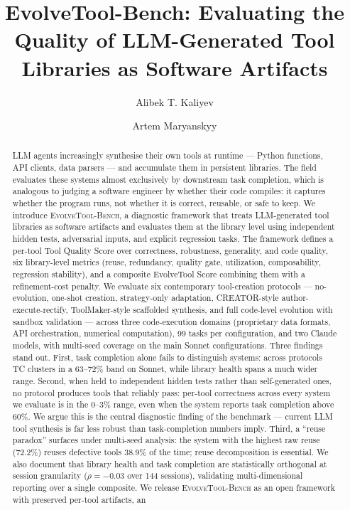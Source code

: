 \documentclass[sigplan,nonacm,natbib=false]{acmart}
\begin{document}
\title{EvolveTool-Bench: Evaluating the Quality of LLM-Generated Tool Libraries as Software Artifacts}

\author{Alibek T. Kaliyev}

\author{Artem Maryanskyy}

\begin{abstract}
LLM agents increasingly synthesise their own tools at runtime --- Python functions, API clients, data parsers --- and accumulate them in persistent libraries. The field evaluates these systems almost exclusively by downstream task completion, which is analogous to judging a software engineer by whether their code compiles: it captures whether the program runs, not whether it is correct, reusable, or safe to keep. We introduce \textsc{EvolveTool-Bench}, a diagnostic framework that treats LLM-generated tool libraries as software artifacts and evaluates them at the library level using independent hidden tests, adversarial inputs, and explicit regression tasks. The framework defines a per-tool Tool Quality Score over correctness, robustness, generality, and code quality, six library-level metrics (reuse, redundancy, quality gate, utilization, composability, regression stability), and a composite EvolveTool Score combining them with a refinement-cost penalty. We evaluate six contemporary tool-creation protocols --- no-evolution, one-shot creation, strategy-only adaptation, CREATOR-style author-execute-rectify, ToolMaker-style scaffolded synthesis, and full code-level evolution with sandbox validation --- across three code-execution domains (proprietary data formats, API orchestration, numerical computation), 99 tasks per configuration, and two Claude models, with multi-seed coverage on the main Sonnet configurations. Three findings stand out. First, task completion alone fails to distinguish systems: across protocols TC clusters in a 63--72\% band on Sonnet, while library health spans a much wider range. Second, when held to independent hidden tests rather than self-generated ones, no protocol produces tools that reliably pass: per-tool correctness across every system we evaluate is in the 0--3\% range, even when the system reports task completion above 60\%. We argue this is the central diagnostic finding of the benchmark --- current LLM tool synthesis is far less robust than task-completion numbers imply. Third, a ``reuse paradox'' surfaces under multi-seed analysis: the system with the highest raw reuse (72.2\%) reuses defective tools 38.9\% of the time; reuse decomposition is essential. We also document that library health and task completion are statistically orthogonal at session granularity ($\rho = -0.03$ over 144 sessions), validating multi-dimensional reporting over a single composite. We release \textsc{EvolveTool-Bench} as an open framework with preserved per-tool artifacts, an 
\end{abstract}
\end{document}
